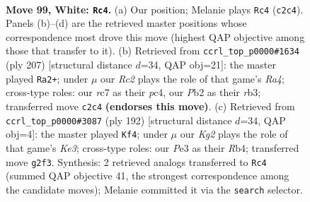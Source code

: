 \documentclass[11pt]{article}
\begin{document}
\clearpage

\begin{figure}[p]\centering
\begin{subfigure}{0.46\textwidth}\centering
\resizebox{\linewidth}{!}{%
\newchessgame
\chessboard[
  setfen={8/2r5/p2k4/P1p2p1p/1p3P1P/4P1P1/1PR3K1/8 w - - 9 99},
  showmover=false,
  pgfstyle=straightmove, color=movearrow, markmove={c2-c4}
]}
\caption{}
\end{subfigure}\hfill
\begin{subfigure}{0.46\textwidth}\centering
\resizebox{\linewidth}{!}{%
\newchessgame
\chessboard[
  setfen={8/2p5/3p2pk/r2Pp1p1/2P1P3/1R3P1P/5K2/8 b - - 26 104},
  showmover=false,
  pgfstyle=straightmove, color=movearrow, markmove={a5-a2}
]}
\caption{}
\end{subfigure}
\\[4pt]
\begin{subfigure}{0.46\textwidth}\centering
\resizebox{\linewidth}{!}{%
\newchessgame
\chessboard[
  setfen={4k3/4p3/p2pr3/P4p1p/1RP4P/4KPP1/8/8 w - - 0 97},
  showmover=false,
  pgfstyle=straightmove, color=movearrow, markmove={e3-f4}
]}
\caption{}
\end{subfigure}\hfill

\caption{\textbf{Move 99, White: \texttt{Rc4}.} (a) Our position; Melanie plays \texttt{Rc4} (\texttt{c2c4}). Panels (b)--(d) are the retrieved master positions whose correspondence most drove this move (highest QAP objective among those that transfer to it). (b) Retrieved from \texttt{ccrl\_top\_p0000\#1634} (ply 207) [structural distance $d$=34, QAP obj=21]: the master played \texttt{Ra2+}; under $\mu$ our \emph{Rc2} plays the role of that game's \emph{Ra4}; cross-type roles: our \emph{r}c7 as their \emph{p}c4, our \emph{P}b2 as their \emph{r}b3; transferred move \texttt{c2c4} \textbf{(endorses this move)}. (c) Retrieved from \texttt{ccrl\_top\_p0000\#3087} (ply 192) [structural distance $d$=34, QAP obj=4]: the master played \texttt{Kf4}; under $\mu$ our \emph{Kg2} plays the role of that game's \emph{Ke3}; cross-type roles: our \emph{P}e3 as their \emph{R}b4; transferred move \texttt{g2f3}. Synthesis: 2 retrieved analogs transferred to \texttt{Rc4} (summed QAP objective 41, the strongest correspondence among the candidate moves); Melanie committed it via the \texttt{search} selector.}
\label{fig:thought-m196}
\end{figure}

\clearpage
\end{document}
